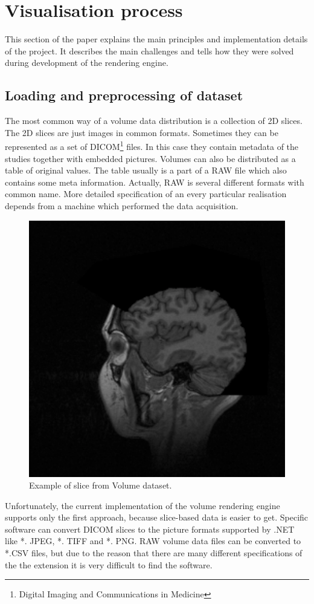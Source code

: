 \documentclass[twoside, english, 11pt]{report}
\begin{document}
\section{Visualisation process}

This section of the paper explains the main principles and implementation details of the project. It describes the main challenges and tells how they were solved during development of the rendering engine.

\subsection{Loading and preprocessing of dataset}
The most common way of a volume data distribution is a collection of 2D slices. The 2D slices are just images in common formats. Sometimes they can be represented as a set of DICOM\footnote{Digital Imaging and Communications in Medicine} files. In this case they contain metadata of the studies together with embedded pictures. Volumes can also be distributed as a table of original values. The table usually is a part of a RAW file which also contains some meta information. Actually, RAW is several different formats with common name. More detailed specification of an every particular realisation depends from a machine which performed the data acquisition.\\
\begin{figure}[!h]
\centerline{\includegraphics[scale = 0.35]{img/slice}}
\caption{Example of slice from Volume dataset.\label{fig:slice}}
\end{figure}
Unfortunately, the current implementation of the volume rendering engine supports only the first approach, because slice-based data is easier to get. Specific software can convert DICOM slices to the picture formats supported by .NET like *. JPEG, *. TIFF and *. PNG. RAW volume data files can be converted to *.CSV files, but due to the reason that there are many different specifications of the the extension it is very difficult to find the software.\\
\end{document}
